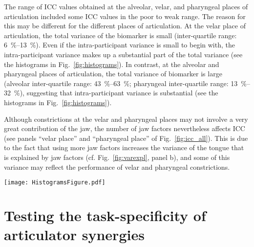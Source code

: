 \documentclass[reprint]{JASAnew}\usepackage[]{graphicx}\usepackage[]{color}
\begin{document}
The range of ICC values obtained at the alveolar, velar, and pharyngeal places of articulation included some ICC values in the poor to weak range. 
%
The reason for this may be different for the different places of articulation. 
%
At the velar place of articulation, the total variance of the biomarker is small
(inter-quartile range: \SIrange{6}{13}{\percent}). 
Even if the intra-participant variance is small to begin with, the intra-participant variance makes up a substantial part of the total variance (see the histograms in Fig.~\ref{fig:histograms}). 
%
In contrast, at the alveolar and pharyngeal places of articulation, the total variance of biomarker is large 
(alveolar inter-quartile range: \SIrange{43}{63}{\percent};
pharyngeal inter-quartile range: \SIrange{13}{32}{\percent}),
suggesting that intra-participant variance is substantial (see the histograms in Fig.~\ref{fig:histograms}). 

Although constrictions at the velar and pharyngeal places may not involve a very great contribution of the jaw, the number of jaw factors nevertheless affects ICC (see panels ``velar place'' and ``pharyngeal place'' of Fig.~\ref{fig:icc_all}). This is due to the fact that using more jaw factors increases the variance of the tongue that is explained by jaw factors (cf. Fig.~\ref{fig:varexpl}, panel b), and some of this variance may reflect the performance of velar and pharyngeal constrictions. 


\begin{figure*}[t]

\texttt{[image: HistogramsFigure.pdf]}

\caption{\label{fig:histograms}(color online) 
Sample distribution of the jaw contributions to constrictions at the bilabial, alveolar, palatal, velar, and pharyngeal places of articulation. The quantity plotted is the percent of a constriction that was produced by the jaw.
A value of \SI{0}{\percent} indicates that lip or tongue motion produced the entire constriction, whereas a value of \SI{100}{\percent} indicates that jaw motion produced the entire constriction. 
Sample distribution by participant shown with a different color for each participant.}

\end{figure*}




\section{Testing the task-specificity of articulator synergies}
\label{sec:taskspec}
\end{document}
